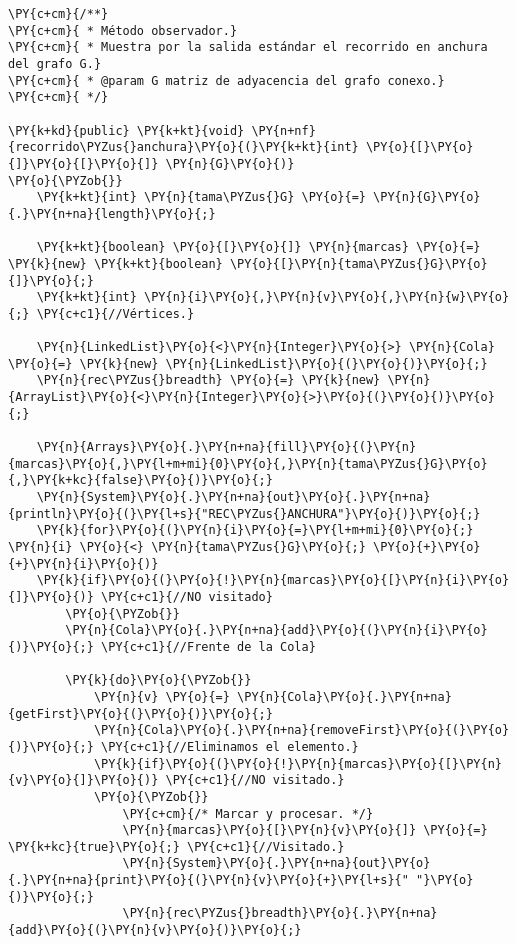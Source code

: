 \begin{Verbatim}[commandchars=\\\{\}]
\PY{c+cm}{/**}
\PY{c+cm}{ * Método observador.}
\PY{c+cm}{ * Muestra por la salida estándar el recorrido en anchura del grafo G.}
\PY{c+cm}{ * @param G matriz de adyacencia del grafo conexo.}
\PY{c+cm}{ */}

\PY{k+kd}{public} \PY{k+kt}{void} \PY{n+nf}{recorrido\PYZus{}anchura}\PY{o}{(}\PY{k+kt}{int} \PY{o}{[}\PY{o}{]}\PY{o}{[}\PY{o}{]} \PY{n}{G}\PY{o}{)} 
\PY{o}{\PYZob{}}
    \PY{k+kt}{int} \PY{n}{tama\PYZus{}G} \PY{o}{=} \PY{n}{G}\PY{o}{.}\PY{n+na}{length}\PY{o}{;}

    \PY{k+kt}{boolean} \PY{o}{[}\PY{o}{]} \PY{n}{marcas} \PY{o}{=} \PY{k}{new} \PY{k+kt}{boolean} \PY{o}{[}\PY{n}{tama\PYZus{}G}\PY{o}{]}\PY{o}{;}
    \PY{k+kt}{int} \PY{n}{i}\PY{o}{,}\PY{n}{v}\PY{o}{,}\PY{n}{w}\PY{o}{;} \PY{c+c1}{//Vértices.}

    \PY{n}{LinkedList}\PY{o}{<}\PY{n}{Integer}\PY{o}{>} \PY{n}{Cola} \PY{o}{=} \PY{k}{new} \PY{n}{LinkedList}\PY{o}{(}\PY{o}{)}\PY{o}{;}
    \PY{n}{rec\PYZus{}breadth} \PY{o}{=} \PY{k}{new} \PY{n}{ArrayList}\PY{o}{<}\PY{n}{Integer}\PY{o}{>}\PY{o}{(}\PY{o}{)}\PY{o}{;}

    \PY{n}{Arrays}\PY{o}{.}\PY{n+na}{fill}\PY{o}{(}\PY{n}{marcas}\PY{o}{,}\PY{l+m+mi}{0}\PY{o}{,}\PY{n}{tama\PYZus{}G}\PY{o}{,}\PY{k+kc}{false}\PY{o}{)}\PY{o}{;}
    \PY{n}{System}\PY{o}{.}\PY{n+na}{out}\PY{o}{.}\PY{n+na}{println}\PY{o}{(}\PY{l+s}{"REC\PYZus{}ANCHURA"}\PY{o}{)}\PY{o}{;}
    \PY{k}{for}\PY{o}{(}\PY{n}{i}\PY{o}{=}\PY{l+m+mi}{0}\PY{o}{;} \PY{n}{i} \PY{o}{<} \PY{n}{tama\PYZus{}G}\PY{o}{;} \PY{o}{+}\PY{o}{+}\PY{n}{i}\PY{o}{)}
	\PY{k}{if}\PY{o}{(}\PY{o}{!}\PY{n}{marcas}\PY{o}{[}\PY{n}{i}\PY{o}{]}\PY{o}{)} \PY{c+c1}{//NO visitado}
	    \PY{o}{\PYZob{}}
		\PY{n}{Cola}\PY{o}{.}\PY{n+na}{add}\PY{o}{(}\PY{n}{i}\PY{o}{)}\PY{o}{;} \PY{c+c1}{//Frente de la Cola}
		    
		\PY{k}{do}\PY{o}{\PYZob{}}
		    \PY{n}{v} \PY{o}{=} \PY{n}{Cola}\PY{o}{.}\PY{n+na}{getFirst}\PY{o}{(}\PY{o}{)}\PY{o}{;}
		    \PY{n}{Cola}\PY{o}{.}\PY{n+na}{removeFirst}\PY{o}{(}\PY{o}{)}\PY{o}{;} \PY{c+c1}{//Eliminamos el elemento.}
		    \PY{k}{if}\PY{o}{(}\PY{o}{!}\PY{n}{marcas}\PY{o}{[}\PY{n}{v}\PY{o}{]}\PY{o}{)} \PY{c+c1}{//NO visitado.}
			\PY{o}{\PYZob{}}
			    \PY{c+cm}{/* Marcar y procesar. */}
			    \PY{n}{marcas}\PY{o}{[}\PY{n}{v}\PY{o}{]} \PY{o}{=} \PY{k+kc}{true}\PY{o}{;} \PY{c+c1}{//Visitado.}
			    \PY{n}{System}\PY{o}{.}\PY{n+na}{out}\PY{o}{.}\PY{n+na}{print}\PY{o}{(}\PY{n}{v}\PY{o}{+}\PY{l+s}{" "}\PY{o}{)}\PY{o}{;}
			    \PY{n}{rec\PYZus{}breadth}\PY{o}{.}\PY{n+na}{add}\PY{o}{(}\PY{n}{v}\PY{o}{)}\PY{o}{;}
				

\end{Verbatim}
